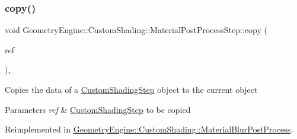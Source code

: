 \mbox{\label{class_geometry_engine_1_1_custom_shading_1_1_material_post_process_step_aed622b637ae01f6a3cfa5d7f60c63ac6}} 
\subsubsection{\texorpdfstring{copy()}{copy()}}
{\footnotesize\ttfamily void Geometry\+Engine\+::\+Custom\+Shading\+::\+Material\+Post\+Process\+Step\+::copy (\begin{DoxyParamCaption}\item[{const \mbox{\hyperlink{class_geometry_engine_1_1_custom_shading_1_1_material_post_process_step}{Material\+Post\+Process\+Step}} \&}]{ref }\end{DoxyParamCaption})\hspace{0.3cm}{\ttfamily [protected]}, {\ttfamily [virtual]}}

Copies the data of a \mbox{\hyperlink{class_geometry_engine_1_1_custom_shading_1_1_custom_shading_step}{Custom\+Shading\+Step}} object to the current object 
\begin{DoxyParams}{Parameters}
{\em ref} & \mbox{\hyperlink{class_geometry_engine_1_1_custom_shading_1_1_custom_shading_step}{Custom\+Shading\+Step}} to be copied \\
\hline
\end{DoxyParams}


Reimplemented in \mbox{\hyperlink{class_geometry_engine_1_1_custom_shading_1_1_material_blur_post_process_ab9890776a7a11b969f7139a6d7eba2df}{Geometry\+Engine\+::\+Custom\+Shading\+::\+Material\+Blur\+Post\+Process}}.

\mbox{\label{class_geometry_engine_1_1_custom_shading_1_1_material_post_process_step_af215423d3bda8986ca7b91d76663dc40}} 
